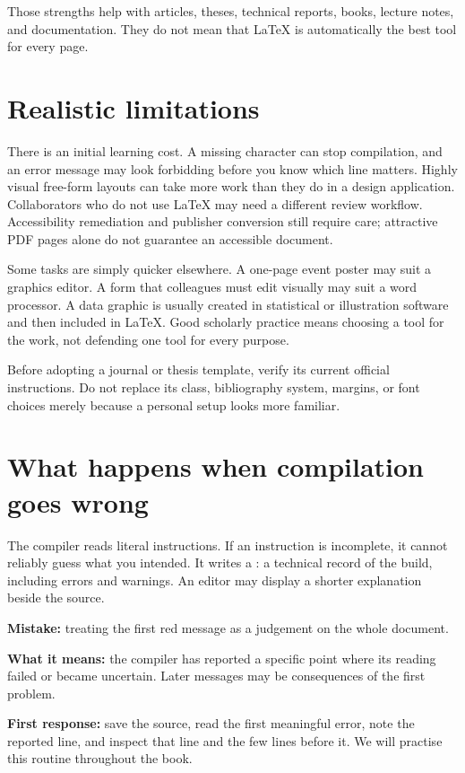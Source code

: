 Those strengths help with articles, theses, technical reports, books, lecture
notes, and documentation. They do not mean that \LaTeX{} is automatically the
best tool for every page.

\section{Realistic limitations}

There is an initial learning cost. A missing character can stop compilation,
and an error message may look forbidding before you know which line matters.
Highly visual free-form layouts can take more work than they do in a design
application. Collaborators who do not use \LaTeX{} may need a different review
workflow. Accessibility remediation and publisher conversion still require
care; attractive PDF pages alone do not guarantee an accessible document.

Some tasks are simply quicker elsewhere. A one-page event poster may suit a
graphics editor. A form that colleagues must edit visually may suit a word
processor. A data graphic is usually created in statistical or illustration
software and then included in \LaTeX{}. Good scholarly practice means choosing a
tool for the work, not defending one tool for every purpose.

\begin{goodpractice}
Before adopting a journal or thesis template, verify its current official
instructions. Do not replace its class, bibliography system, margins, or font
choices merely because a personal setup looks more familiar.
\end{goodpractice}

\section{What happens when compilation goes wrong}

The compiler reads literal instructions. If an instruction is incomplete, it
cannot reliably guess what you intended. It writes a : a technical
record of the build, including errors and warnings. An editor may display a
shorter explanation beside the source.

\begin{commonerror}
\textbf{Mistake:} treating the first red message as a judgement on the whole
document.

\textbf{What it means:} the compiler has reported a specific point where its
reading failed or became uncertain. Later messages may be consequences of the
first problem.

\textbf{First response:} save the source, read the first meaningful error,
note the reported line, and inspect that line and the few lines before it. We
will practise this routine throughout the book.
\end{commonerror}

